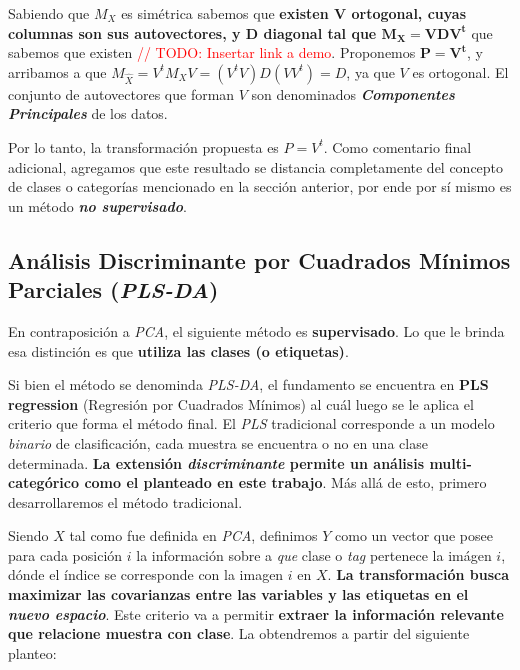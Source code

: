Sabiendo que $M_{X}$ es sim\'etrica sabemos que \textbf{existen $\mathbf{V}$ ortogonal, cuyas columnas son sus autovectores, y $\mathbf{D}$ diagonal tal que $\mathbf{M_{X} = VDV^{t}}$} que sabemos que existen \textcolor{red}{// TODO: Insertar link a demo}. Proponemos $\mathbf{P = V^{t}}$, y arribamos a que $M_{\hat{X}} = V^{t}M_{X}V = (V^{t}V)D(VV^{t}) = D$, ya que $V$ es ortogonal. El conjunto de autovectores que forman $V$ son denominados \textbf{\textit{Componentes Principales}} de los datos.

Por lo tanto, la transformaci\'on propuesta es $P = V^{t}$. Como comentario final adicional, agregamos que este resultado se distancia completamente del concepto de clases o categor\'ias mencionado en la secci\'on anterior, por ende por s\'i mismo es un m\'etodo \textbf{\textit{no supervisado}}.

\subsection{An\'alisis Discriminante por Cuadrados M\'inimos Parciales (\textit{PLS-DA})}\label{intro_PLSDA}

En contraposici\'on a \textit{PCA}, el siguiente m\'etodo es \textbf{supervisado}. Lo que le brinda esa distinci\'on es que \textbf{utiliza las clases (o etiquetas)}.

Si bien el m\'etodo se denominda \textit{PLS-DA}, el fundamento se encuentra en \textbf{PLS regression} (Regresi\'on por Cuadrados M\'inimos) al cu\'al luego se le aplica el criterio que forma el m\'etodo final. El \textit{PLS} tradicional corresponde a un modelo \textit{binario} de clasificaci\'on, cada muestra se encuentra o no en una clase determinada. \textbf{La extensi\'on \textit{discriminante} permite un an\'alisis multi-categ\'orico como el planteado en este trabajo}. M\'as all\'a de esto, primero desarrollaremos el m\'etodo tradicional.

Siendo $X$ tal como fue definida en \textit{PCA}, definimos $Y$ como un vector que posee para cada posici\'on $i$ la informaci\'on sobre a \textit{que} clase o \textit{tag} pertenece la im\'agen $i$, d\'onde el \'indice se corresponde con la imagen $i$ en $X$. \textbf{La transformaci\'on busca maximizar las covarianzas entre las variables y las etiquetas en el \textit{nuevo espacio}}. Este criterio va a permitir \textbf{extraer la informaci\'on relevante que relacione muestra con clase}. La obtendremos a partir del siguiente planteo: \\

